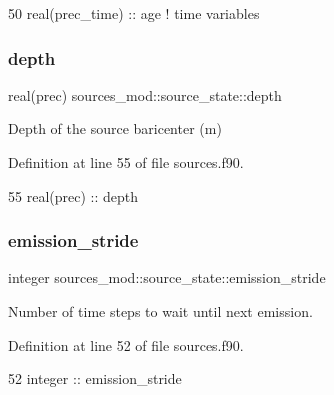 \begin{DoxyCode}
50         \textcolor{keywordtype}{real(prec\_time)} :: age              \textcolor{comment}{! time variables}
\end{DoxyCode}
\mbox{\label{structsources__mod_1_1source__state_a4dbafcfac12c749efd402a71e01a25cd}} 
\subsubsection{\texorpdfstring{depth}{depth}}
{\footnotesize\ttfamily real(prec) sources\+\_\+mod\+::source\+\_\+state\+::depth\hspace{0.3cm}{\ttfamily [private]}}



Depth of the source baricenter (m) 



Definition at line 55 of file sources.\+f90.


\begin{DoxyCode}
55         \textcolor{keywordtype}{real(prec)} :: depth
\end{DoxyCode}
\mbox{\label{structsources__mod_1_1source__state_ae548879890ef326906a63d6555377e80}} 
\subsubsection{\texorpdfstring{emission\+\_\+stride}{emission\_stride}}
{\footnotesize\ttfamily integer sources\+\_\+mod\+::source\+\_\+state\+::emission\+\_\+stride\hspace{0.3cm}{\ttfamily [private]}}



Number of time steps to wait until next emission. 



Definition at line 52 of file sources.\+f90.


\begin{DoxyCode}
52         \textcolor{keywordtype}{integer} :: emission\_stride
\end{DoxyCode}
\mbox{\label{structsources__mod_1_1source__state_a8dacf7040158bb5214f66476bf1a1c3d}} 
